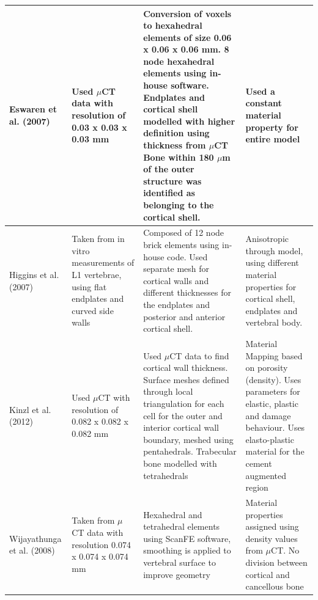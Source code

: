 \begin{landscape}
\begin{longtable}{P{3cm}|P{2.5cm}|P{5.5cm}|P{5cm}}
\hline
Eswaren et al. (2007) \cite{Eswaran2007} & Used $\mu$CT data with resolution of 0.03 x
0.03 x
0.03 mm & Conversion of voxels to hexahedral elements of size 0.06 x
0.06 x 0.06 mm. 8 node hexahedral elements using in-house software.
Endplates and cortical shell modelled with higher definition using
thickness from $\mu$CT Bone within 180 $\mu$m of the outer structure was
identified as belonging to the cortical shell. & Used a constant
material property for entire model\\
\hline
Higgins et al. (2007) \cite{Higgins2007a} & Taken from in vitro measurements of L1
vertebrae, using flat endplates and curved side walls & Composed of 12
node brick elements using in-house code. Used separate mesh for cortical
walls and different thicknesses for the endplates and posterior and
anterior cortical shell. & Anisotropic through model, using different
material properties for cortical shell, endplates and vertebral
body.\\
\hline
Kinzl et al. (2012) \cite{Kinzl2012} & Used $\mu$CT with resolution of 0.082 x 0.082 x
0.082 mm & Used $\mu$CT data to find cortical wall thickness. Surface meshes
defined through local triangulation for each cell for the outer and
interior cortical wall boundary, meshed using pentahedrals. Trabecular
bone modelled with tetrahedrals & Material Mapping based on porosity
(density). Uses parameters for elastic, plastic and damage behaviour.
Uses elasto-plastic material for the cement augmented
region\\
\hline
Wijayathunga et al. (2008) \cite{Wijayathunga2008} & Taken from $\mu$CT data with
resolution 0.074
x 0.074 x 0.074 mm & Hexahedral and tetrahedral elements using ScanFE
software, smoothing is applied to vertebral surface to improve geometry
& Material properties assigned using density values from $\mu$CT. No
division between cortical and cancellous bone\\


\end{longtable}

\end{landscape}

